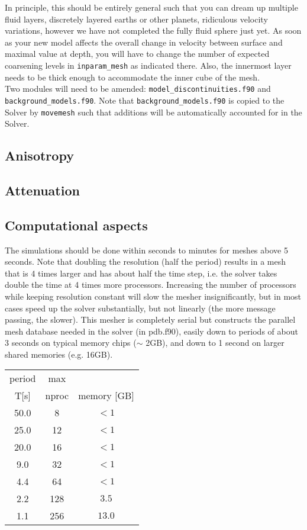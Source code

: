 \documentclass[11pt,letter,fleqn,english,notitlepage]{article}
\begin{document}
\noindent In principle, this should be entirely general such that you can dream
up multiple fluid layers, discretely layered earths or other planets,
ridiculous velocity variations, however we have not completed the fully fluid
sphere just yet. As soon as your new model affects the overall change in
velocity between surface and maximal value at depth, you will have to change
the number of expected coarsening levels in {\tt inparam\_mesh} as indicated
there. Also, the innermost layer needs to be thick enough to accommodate the
inner cube of the mesh. \\

\noindent Two modules will need to be amended: {\tt model\_discontinuities.f90}
and {\tt background\_models.f90}.  Note that {\tt background\_models.f90} is
copied to the Solver by {\tt movemesh} such that additions will be
automatically accounted for in the Solver. 

\subsection{Anisotropy}

\subsection{Attenuation}

\subsection{Computational aspects}
The simulations should be done within seconds to minutes for meshes above 5
seconds.  Note that doubling the resolution (half the period) results in a mesh
that is 4 times larger and has about half the time step, i.e. the solver takes
double the time at 4 times more processors. Increasing the number of processors
while keeping resolution constant will slow the mesher insignificantly, but in
most cases speed up the solver substantially, but not linearly (the more
message passing, the slower).  This mesher is completely serial but constructs
the parallel mesh database needed in the solver (in pdb.f90), easily down to
periods of about 3 seconds on typical memory chips ($\sim$ 2GB), and down to 1
second on larger shared memories (e.g. 16GB).

\begin{table}[h]
\begin{tabular}{ccc}
period & max  \\
 T[s]  & nproc & memory [GB] \\
\hline
 50.0 &    8  &  $< 1$  \\
 25.0 &   12  &  $< 1$  \\
 20.0 &   16  &  $< 1$  \\
  9.0 &   32  &  $< 1$  \\
  4.4 &   64  &  $< 1$  \\
  2.2 &  128  &  $ 3.5 $ \\
  1.1 &  256  &  $13.0 $ \\
\end{tabular}
\end{table}
\end{document}
